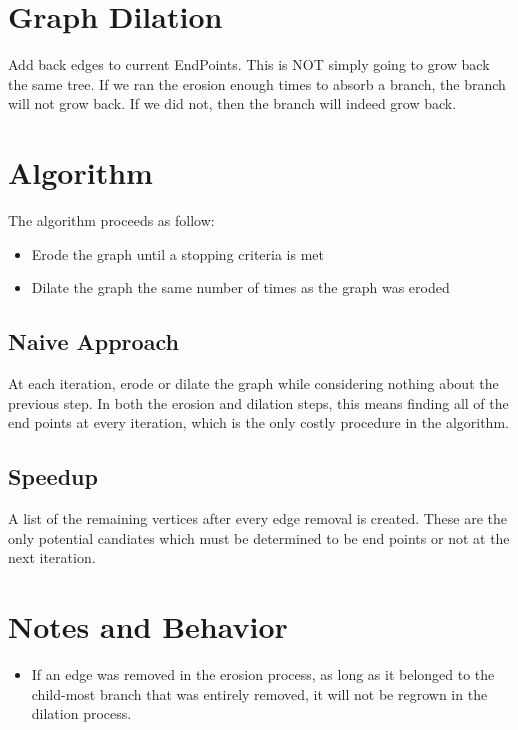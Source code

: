 \documentclass{InsightArticle}
\begin{document}
\section{Graph Dilation}
Add back edges to current EndPoints. This is NOT simply going to grow back the same tree. If we ran the erosion enough times
to absorb a branch, the branch will not grow back. If we did not, then the branch will indeed grow back.

\section{Algorithm}
\label{sec:Algorithm}
The algorithm proceeds as follow:
\begin{itemize}
 \item Erode the graph until a stopping criteria is met
 \item Dilate the graph the same number of times as the graph was eroded
\end{itemize}

\subsection{Naive Approach}
At each iteration, erode or dilate the graph while considering nothing about the previous step. In both the erosion and dilation steps, this means finding all of the end points at every iteration, which is the only costly procedure in the algorithm.

\subsection{Speedup}
A list of the remaining vertices after every edge removal is created. These are the only potential candiates which must be determined to be end points or not at the next iteration.

\section{Notes and Behavior}
\begin{itemize}
 \item If an edge was removed in the erosion process, as long as it belonged to the child-most branch that was entirely removed, it will not be regrown in the dilation process.
\end{itemize}


\end{document}
